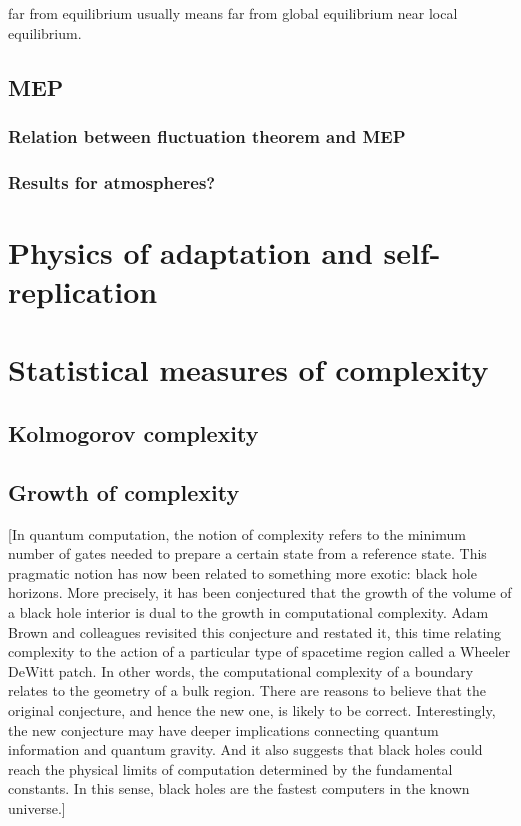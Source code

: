 \documentclass[a4paper,12pt,nofootinbib]{article}
\begin{document}
far from equilibrium usually means far from global equilibrium near local equilibrium.

\subsection{MEP}
\subsubsection{Relation between fluctuation theorem and MEP}
\subsubsection{Results for atmospheres?}
\section{Physics of adaptation and self-replication}

\section{Statistical measures of complexity}
\subsection{Kolmogorov complexity}

\subsection{Growth of complexity}


[In quantum computation, the notion of complexity refers to the minimum number of gates needed to prepare a certain state from a reference state. This pragmatic notion has now been related to something more exotic: black hole horizons. More precisely, it has been conjectured that the growth of the volume of a black hole interior is dual to the growth in computational complexity. Adam Brown and colleagues revisited this conjecture and restated it, this time relating complexity to the action of a particular type of spacetime region called a Wheeler DeWitt patch. In other words, the computational complexity of a boundary relates to the geometry of a bulk region.
There are reasons to believe that the original conjecture, and hence the new one, is likely to be correct. Interestingly, the new conjecture may have deeper implications connecting quantum information and quantum gravity. And it also suggests that black holes could reach the physical limits of computation determined by the fundamental constants. In this sense, black holes are the fastest computers in the known universe.]



\end{document}
